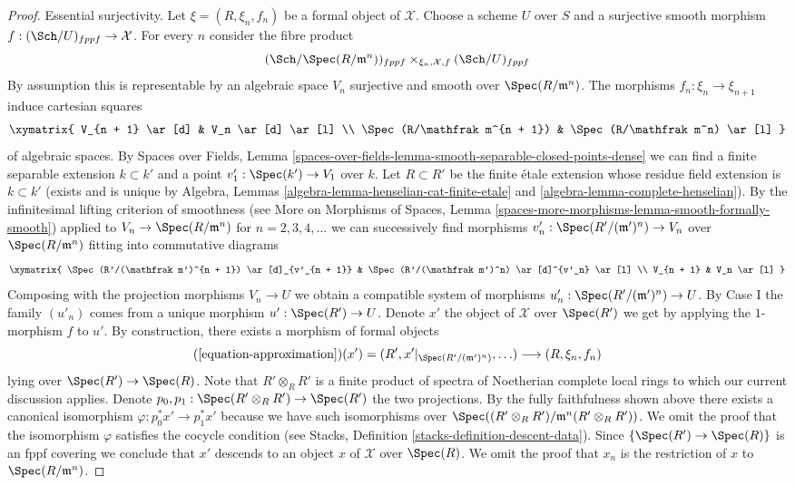 \begin{proof}
\medskip\noindent
Essential surjectivity. Let $\xi = (R, \xi_n, f_n)$ be a formal object of
$\mathcal{X}$. Choose a scheme $U$ over $S$ and a surjective smooth morphism
$f : (\Sch/U)_{fppf} \to \mathcal{X}$. For every $n$ consider the fibre product
$$
(\Sch/\Spec(R/\mathfrak m^n))_{fppf}
\times_{\xi_n, \mathcal{X}, f}
(\Sch/U)_{fppf}
$$
By assumption this is representable by an algebraic space $V_n$ surjective and
smooth over $\Spec(R/\mathfrak m^n)$. The morphisms
$f_n : \xi_n \to \xi_{n + 1}$ induce cartesian squares
$$
\xymatrix{
V_{n + 1} \ar[d] & V_n \ar[d] \ar[l] \\
\Spec(R/\mathfrak m^{n + 1}) & \Spec(R/\mathfrak m^n) \ar[l]
}
$$
of algebraic spaces. By Spaces over Fields, Lemma
\ref{spaces-over-fields-lemma-smooth-separable-closed-points-dense}
we can find a finite separable extension $k \subset k'$ and a point
$v'_1 : \Spec(k') \to V_1$ over $k$. Let $R \subset R'$ be the finite \'etale
extension whose residue field extension is $k \subset k'$ (exists and
is unique by
Algebra, Lemmas \ref{algebra-lemma-henselian-cat-finite-etale} and
\ref{algebra-lemma-complete-henselian}).
By the infinitesimal lifting criterion of smoothness (see
More on Morphisms of Spaces, Lemma
\ref{spaces-more-morphisms-lemma-smooth-formally-smooth})
applied to $V_n \to \Spec(R/\mathfrak m^n)$ for $n = 2, 3, 4, \ldots$
we can successively find morphisms
$v'_n : \Spec(R'/(\mathfrak m')^n) \to V_n$ over $\Spec(R/\mathfrak m^n)$
fitting into commutative diagrams
$$
\xymatrix{
\Spec(R'/(\mathfrak m')^{n + 1}) \ar[d]_{v'_{n + 1}} &
\Spec(R'/(\mathfrak m')^n) \ar[d]^{v'_n} \ar[l] \\
V_{n + 1} & V_n \ar[l]
}
$$
Composing with the projection morphisms $V_n \to U$ we obtain a compatible
system of morphisms $u'_n : \Spec(R'/(\mathfrak m')^n) \to U$.
By Case I the family $(u'_n)$ comes from a unique
morphism $u' : \Spec(R') \to U$. Denote $x'$ the object of $\mathcal{X}$
over $\Spec(R')$ we get by applying the $1$-morphism $f$ to $u'$.
By construction, there exists a morphism of formal objects
$$
(\ref{equation-approximation})(x') =
(R', x'|_{\Spec(R'/(\mathfrak m')^n)}, \ldots)
\longrightarrow
(R, \xi_n, f_n)
$$
lying over $\Spec(R') \to \Spec(R)$. Note that $R' \otimes_R R'$ is a finite
product of spectra of Noetherian complete local rings to which our current
discussion applies. Denote $p_0, p_1 : \Spec(R' \otimes_R R') \to \Spec(R')$
the two projections. By the fully faithfulness shown above there exists
a canonical isomorphism $\varphi : p_0^*x' \to p_1^*x'$ because we have
such isomorphisms over
$\Spec((R' \otimes_R R')/\mathfrak m^n(R' \otimes_R R'))$.
We omit the proof that the isomorphism $\varphi$ satisfies the cocycle
condition (see Stacks, Definition \ref{stacks-definition-descent-data}).
Since $\{\Spec(R') \to \Spec(R)\}$ is an fppf covering we conclude
that $x'$ descends to an object $x$ of $\mathcal{X}$ over $\Spec(R)$.
We omit the proof that $x_n$ is the restriction of $x$ to
$\Spec(R/\mathfrak m^n)$.
\end{proof}

